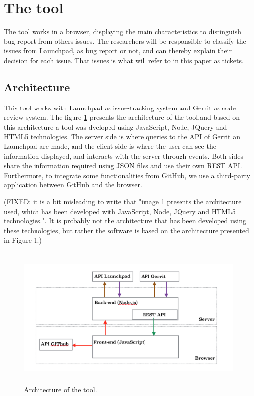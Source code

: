 \documentclass[runningheads,a4paper]{llncs}
\begin{document}
\section{The tool}
\label{sec:2}

The tool works in a browser, displaying the main characteristics to distinguish bug report from others issues. The researchers will be responsible to classify the issues from Launchpad, as bug report or not, and can thereby explain their decision for each issue. That issues is what will refer to in this paper as tickets.


\subsection{Architecture}

This tool works with Launchpad as issue-tracking system and Gerrit as code review system. The figure \ref{fig:1} presents the architecture of the tool,and based on this architecture a tool was dveloped using JavaScript, Node, JQuery and HTML5 technologies. The server side is where queries to the API of Gerrit an Launchpad are made, and the client side is where the user can see the information displayed, and interacts with the server through events. Both sides share the information required using JSON files and use their own REST API. Furthermore, to integrate some functionalities from GitHub, we use a third-party application between GitHub and the browser.

(FIXED: it is a bit misleading to write that "image 1 presents the architecture used, which has been developed with JavaScript, Node, JQuery and HTML5 technologies.". It is probably not the architecture that has been developed using these technologies, but rather the software is based on the architecture presented in Figure 1.)

\label{sec:2.1}
\begin{figure}
\centering
\includegraphics[height=7cm]{Arquitectura.png}
\caption{Architecture of the tool.}
\label{fig:1}       %
\end{figure}
\end{document}
